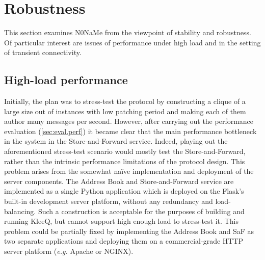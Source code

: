\documentclass[a4paper, twoside, 12pt]{report}
\newcommand{\funkytt}{\fontfamily{AnonymousPro}\selectfont}
\begin{document}
\section{Robustness}
\label{sec:eval.robust}
This section examines {\funkytt N0NaMe} from the viewpoint of stability and robustness. Of particular interest are issues of performance under high load and in the setting of transient connectivity.

\subsection{High-load performance}
Initially, the plan was to stress-test the protocol by constructing a clique of a large size out of instances with low patching period and making each of them author many messages per second. However, after carrying out the performance evaluation (\cref{sec:eval.perf}) it became clear that the main performance bottleneck in the system in the Store-and-Forward service. Indeed, playing out the aforementioned stress-test scenario would mostly test the Store-and-Forward, rather than the intrinsic performance limitations of the protocol design. This problem arises from the somewhat na{\"i}ve implementation and deployment of the server components. The Address Book and Store-and-Forward service are implemented as a single Python application which is deployed on the Flask's built-in development server platform, without any redundancy and load-balancing. Such a construction is acceptable for the purposes of building and running KleeQ, but cannot support high enough load to stress-test it. This problem could be partially fixed by implementing the Address Book and SaF as two separate applications and deploying them on a commercial-grade HTTP server platform (\textit{e.g.} Apache or NGINX). \\

\end{document}
